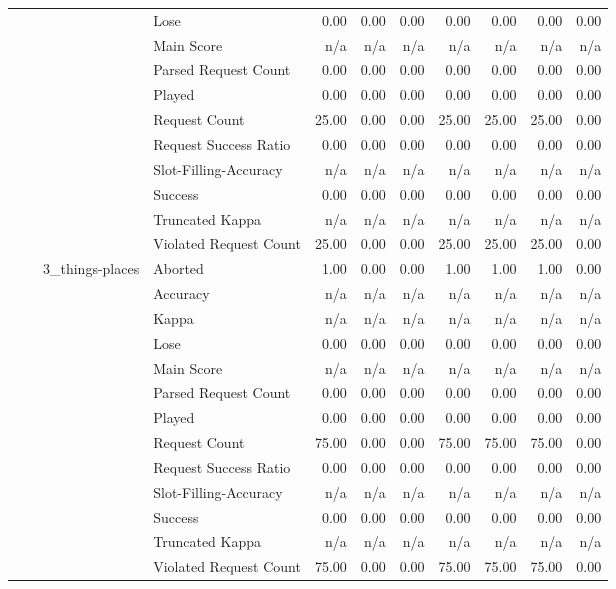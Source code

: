 \begin{tabular}{llllrrrrrrr}
 &  &  & Lose & 0.00 & 0.00 & 0.00 & 0.00 & 0.00 & 0.00 & 0.00 \\
 &  &  & Main Score & n/a & n/a & n/a & n/a & n/a & n/a & n/a \\
 &  &  & Parsed Request Count & 0.00 & 0.00 & 0.00 & 0.00 & 0.00 & 0.00 & 0.00 \\
 &  &  & Played & 0.00 & 0.00 & 0.00 & 0.00 & 0.00 & 0.00 & 0.00 \\
 &  &  & Request Count & 25.00 & 0.00 & 0.00 & 25.00 & 25.00 & 25.00 & 0.00 \\
 &  &  & Request Success Ratio & 0.00 & 0.00 & 0.00 & 0.00 & 0.00 & 0.00 & 0.00 \\
 &  &  & Slot-Filling-Accuracy & n/a & n/a & n/a & n/a & n/a & n/a & n/a \\
 &  &  & Success & 0.00 & 0.00 & 0.00 & 0.00 & 0.00 & 0.00 & 0.00 \\
 &  &  & Truncated Kappa & n/a & n/a & n/a & n/a & n/a & n/a & n/a \\
 &  &  & Violated Request Count & 25.00 & 0.00 & 0.00 & 25.00 & 25.00 & 25.00 & 0.00 \\
\cline{3-11}
 &  & \multirow[t]{13}{*}{3_things-places} & Aborted & 1.00 & 0.00 & 0.00 & 1.00 & 1.00 & 1.00 & 0.00 \\
 &  &  & Accuracy & n/a & n/a & n/a & n/a & n/a & n/a & n/a \\
 &  &  & Kappa & n/a & n/a & n/a & n/a & n/a & n/a & n/a \\
 &  &  & Lose & 0.00 & 0.00 & 0.00 & 0.00 & 0.00 & 0.00 & 0.00 \\
 &  &  & Main Score & n/a & n/a & n/a & n/a & n/a & n/a & n/a \\
 &  &  & Parsed Request Count & 0.00 & 0.00 & 0.00 & 0.00 & 0.00 & 0.00 & 0.00 \\
 &  &  & Played & 0.00 & 0.00 & 0.00 & 0.00 & 0.00 & 0.00 & 0.00 \\
 &  &  & Request Count & 75.00 & 0.00 & 0.00 & 75.00 & 75.00 & 75.00 & 0.00 \\
 &  &  & Request Success Ratio & 0.00 & 0.00 & 0.00 & 0.00 & 0.00 & 0.00 & 0.00 \\
 &  &  & Slot-Filling-Accuracy & n/a & n/a & n/a & n/a & n/a & n/a & n/a \\
 &  &  & Success & 0.00 & 0.00 & 0.00 & 0.00 & 0.00 & 0.00 & 0.00 \\
 &  &  & Truncated Kappa & n/a & n/a & n/a & n/a & n/a & n/a & n/a \\
 &  &  & Violated Request Count & 75.00 & 0.00 & 0.00 & 75.00 & 75.00 & 75.00 & 0.00 \\

\end{tabular}
